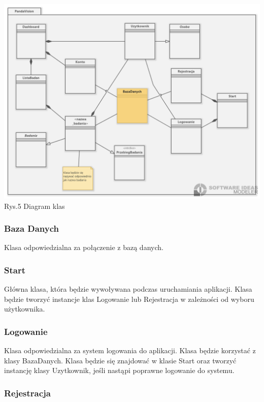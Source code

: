 \documentclass[12pt, letterpaper]{article}
\begin{document}
		\begin{center}
			\includegraphics[scale=0.5]{classDiagram}\\
			\caption{Rys.5 Diagram klas}
		\end{center}
		
		\subsubsection{Baza Danych}	
		
		Klasa odpowiedzialna za połączenie z bazą danych.
		
		\subsubsection{Start}
		
		Główna klasa, która będzie wywoływana podczas uruchamiania aplikacji. Klasa będzie tworzyć instancje klas Logowanie lub Rejestracja w zależności od wyboru użytkownika.
		
		\subsubsection{Logowanie}
		
		Klasa odpowiedzialna za system logowania do aplikacji. Klasa będzie korzystać z klasy BazaDanych. Klasa będzie się znajdować w klasie Start oraz tworzyć instancję klasy Uzytkownik, jeśli nastąpi poprawne logowanie do systemu.
		
		\subsubsection{Rejestracja}
		
\end{document}
